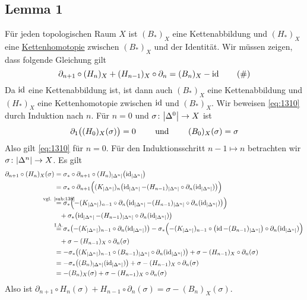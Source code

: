 \subsection[Lemma 1: Kettenhomotopie zwischen $(H_*)_X$ und der Identität]{Lemma 1} %
\label{sub:1310}
Für jeden topologischen Raum $X$ ist $(B_*)_X$ eine Kettenabbildung und $(H_*)_X$ eine \hyperref[sub:76]{Kettenhomotopie} zwischen $(B_*)_X$ und der Identität.
Wir müssen zeigen, dass folgende Gleichung gilt
\begin{equation}
	\partial_{n+1} \circ (H_n)_X + (H_{n-1})_X \circ \partial_n = (B_n)_X - \id \tag{\#} \label{eq:1310}
\end{equation}
Da $\id$ eine Kettenabbildung ist, ist dann auch $(B_*)_X$ eine Kettenabbildung und $(H_*)_X$ eine Kettenhomotopie zwischen $\id$ und $(B_*)_X$. Wir beweisen \eqref{eq:1310}
durch Induktion nach $n$. Für $n=0$ und $\sigma \colon \abs*{\Delta^0} \to X$ ist
\[
	\partial_1 \enbrace[\big]{ (H_0)_X (\sigma)} = 0 \qquad \text{ und } \qquad  (B_0)_X(\sigma) = \sigma 
\]
Also gilt \eqref{eq:1310} für $n=0$. Für den Induktionsschritt $n-1 \mapsto n$ betrachten wir $\sigma \colon \abs*{\Delta^n} \to X$. Es gilt
\begin{align*}
	\partial_{n+1} \circ (H_n)_X (\sigma) &= \sigma_* \circ \partial_{n+1} \circ (H_n)_{\abs*{\Delta^n}} \enbrace*{\id_{\abs*{\Delta^n}}} \\
	&= \sigma_* \circ \partial_{n+1} \enbrace[\Big]{(K_{\abs*{\Delta^n} })_n \enbrace*{ \id_{\abs*{\Delta^n}}- (H_{n-1})_{\abs*{\Delta^n}} \circ \partial_n 
	\enbrace{\id_{\abs*{\Delta^n}}}}} \\
	&\stackrel{\mathclap{\mbox{\scriptsize vgl. \ref{sub:138}}}}{=} \sigma_* \enbrace[\Big]{- (K_{\abs*{\Delta^n}})_{n-1} \circ \partial_n \enbrace*{\id_{\abs{\Delta^n}} 
	- (H_{n-1})_{\abs*{\Delta^n}} \circ \partial_n (\id_{\abs*{\Delta^n} }) } } \\
	&\phantom{ = } + \sigma_* \enbrace*{\id_{\abs*{\Delta^n}} - (H_{n-1})_{\abs*{\Delta^n}} \circ \partial_n (\id_{\abs*{\Delta^n}})} \\
	&\stackrel{\mathclap{\text{I.A.}}}{=} \sigma_*  \enbrace*{- (K_{\abs*{\Delta^n}})_{n-1} \circ \partial_n (\id_{\abs*{\Delta^n}})}  
	- \sigma_* \enbrace[\Big]{- (K_{\abs*{\Delta^n}})_{n-1} \circ  \enbrace*{\id - (B_{n-1})_{\abs*{\Delta^n}}} \circ \partial_n (\id_{\abs*{\Delta^n} }) } \\
	&\phantom{ = } + \sigma- (H_{n-1})_X \circ \partial_n(\sigma) \\
	&= - \sigma_* \enbrace*{(K_{\abs*{\Delta^n}})_{n-1} \circ (B_{n-1})_{\abs*{\Delta^n}} \circ \partial_n(\id_{\abs*{\Delta^n}})}
	+ \sigma - (H_{n-1})_X \circ \partial_n(\sigma) \\
	&= - \sigma_* \enbrace[\big]{(B_n)_{\abs*{\Delta^n}} \enbrace{\id_{\abs*{\Delta^n}}}} + \sigma - (H_{n-1})_X \circ \partial_n (\sigma) \\
	&= -(B_n)_X(\sigma) + \sigma - (H_{n-1})_X \circ \partial_n(\sigma)
\end{align*}
Also ist $\partial_{n+1} \circ H_n(\sigma) + H_{n-1} \circ \partial_{n}(\sigma) = \sigma - (B_n)_X(\sigma)$. \bewende

